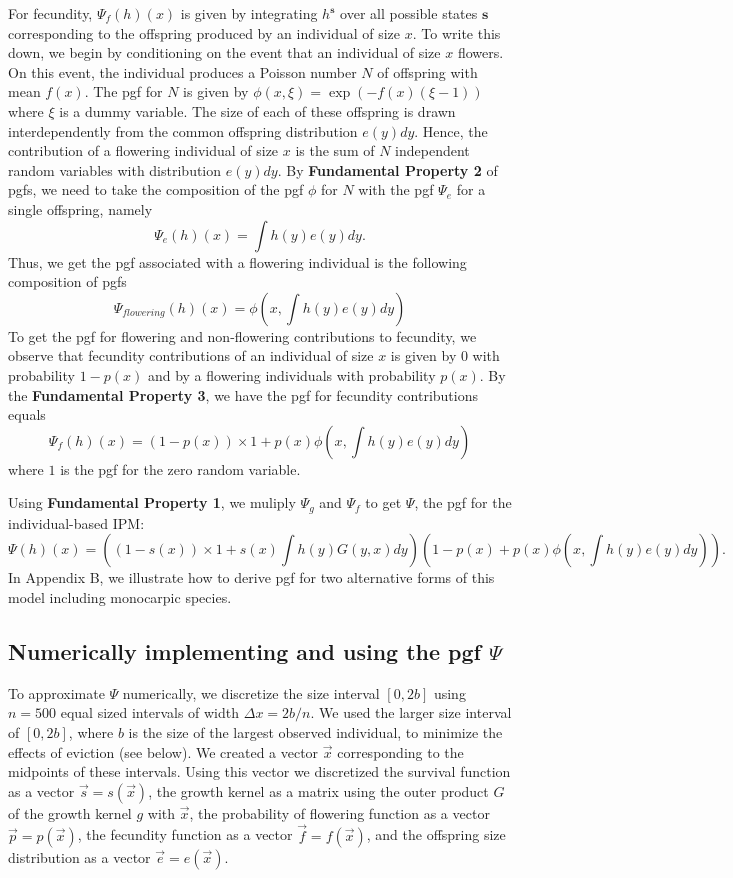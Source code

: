 \documentclass[12pt]{amsart}\usepackage[]{graphicx}\usepackage[]{color}
\def\s{\mathbf s}
\begin{document}
For fecundity, $\Psi_f(h)(x)$ is given by integrating $h^\s$ over all possible states $\s$ corresponding to the offspring produced by an individual of size $x$.  To write this down, we begin by conditioning on the event that an individual of size $x$ flowers. On this event, the individual produces a Poisson number $N$ of offspring with mean $f(x)$. The pgf for $N$ is given by $\phi(x, \xi)=\exp(-f(x)(\xi-1))$ where $\xi$ is a dummy variable. The size of each of these offspring is drawn interdependently from the common offspring distribution $e(y)dy$. Hence, the contribution of a flowering individual of size $x$ is the sum of $N$ independent random variables with distribution $e(y)dy$. By \textbf{Fundamental Property 2} of pgfs, we need to take the composition of the pgf $\phi$ for $N$ with the pgf $\Psi_e$ for a single offspring, namely
\[
\Psi_e(h)(x)=\int h(y)e(y)dy.
\]
Thus, we get the pgf associated with a flowering individual is the following composition of pgfs
\[
\Psi_{flowering}(h)(x)=\phi(x, \int h(y)e(y)dy)
\]
To get the pgf for flowering and non-flowering contributions to fecundity, we observe that fecundity contributions of an individual of size $x$ is given by $0$ with probability $1-p(x)$ and by a flowering individuals with probability $p(x)$. By the \textbf{Fundamental Property 3}, we have the pgf for fecundity contributions equals
\[
\Psi_f (h)(x)=(1-p(x))\times 1+p(x)\phi(x, \int h(y)e(y)dy)
\]
where $1$ is the pgf for the zero random variable. 

Using \textbf{Fundamental Property 1}, we muliply $\Psi_g$ and $\Psi_f$ to get $\Psi$, the pgf for the individual-based IPM:
\[
\Psi(h)(x)=\left((1-s(x))\times 1 + s(x)\int h(y)G(y, x)dy\right)\left(1-p(x)+p(x)\phi(x, \int h(y)e(y)dy)\right).
\]
In Appendix B, we illustrate how to derive pgf for two alternative forms of this model including monocarpic species. 

\subsection*{Numerically implementing and using the pgf $\Psi$}

To approximate $\Psi$ numerically, we discretize the size interval $[0, 2b]$ using $n=500$ equal sized intervals of width $\Delta x=2b/n$. We used the larger size interval of $[0, 2b]$, where $b$ is the size of the largest observed individual, to minimize the effects of eviction (see below). We created a vector $\vec x$ corresponding to the midpoints of these intervals. Using this vector we discretized the survival function as a vector $\vec s=s(\vec x)$, the growth kernel as a matrix using the outer product $G$ of the growth kernel $g$ with $\vec x$, the probability of flowering function as a vector $\vec p=p(\vec x)$, the fecundity function as a vector $\vec f=f(\vec x)$, and the offspring size distribution as a vector $\vec e=e(\vec x)$.
\end{document}
